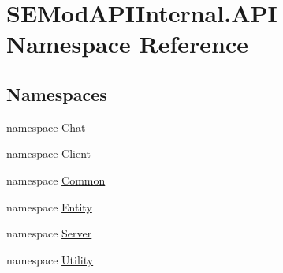 \hypertarget{namespace_s_e_mod_a_p_i_internal_1_1_a_p_i}{}\section{S\+E\+Mod\+A\+P\+I\+Internal.\+A\+P\+I Namespace Reference}
\label{namespace_s_e_mod_a_p_i_internal_1_1_a_p_i}
\subsection*{Namespaces}
\begin{DoxyCompactItemize}
\item 
namespace \hyperlink{namespace_s_e_mod_a_p_i_internal_1_1_a_p_i_1_1_chat}{Chat}
\item 
namespace \hyperlink{namespace_s_e_mod_a_p_i_internal_1_1_a_p_i_1_1_client}{Client}
\item 
namespace \hyperlink{namespace_s_e_mod_a_p_i_internal_1_1_a_p_i_1_1_common}{Common}
\item 
namespace \hyperlink{namespace_s_e_mod_a_p_i_internal_1_1_a_p_i_1_1_entity}{Entity}
\item 
namespace \hyperlink{namespace_s_e_mod_a_p_i_internal_1_1_a_p_i_1_1_server}{Server}
\item 
namespace \hyperlink{namespace_s_e_mod_a_p_i_internal_1_1_a_p_i_1_1_utility}{Utility}
\end{DoxyCompactItemize}
